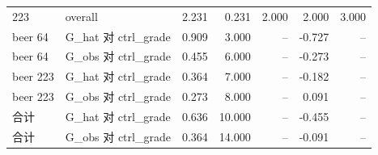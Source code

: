 \begin{table}[htbp]
\begin{tabular}{llrrrrr}
223 & overall & 2.231 & 0.231 & 2.000 & 2.000 & 3.000 \\
beer 64 & G\_hat 对 ctrl\_grade & 0.909 & 3.000 & -- & -0.727 & -- \\
beer 64 & G\_obs 对 ctrl\_grade & 0.455 & 6.000 & -- & -0.273 & -- \\
beer 223 & G\_hat 对 ctrl\_grade & 0.364 & 7.000 & -- & -0.182 & -- \\
beer 223 & G\_obs 对 ctrl\_grade & 0.273 & 8.000 & -- & 0.091 & -- \\
合计 & G\_hat 对 ctrl\_grade & 0.636 & 10.000 & -- & -0.455 & -- \\
合计 & G\_obs 对 ctrl\_grade & 0.364 & 14.000 & -- & -0.091 & -- \\
\bottomrule
\end{tabular}
\end{table}
